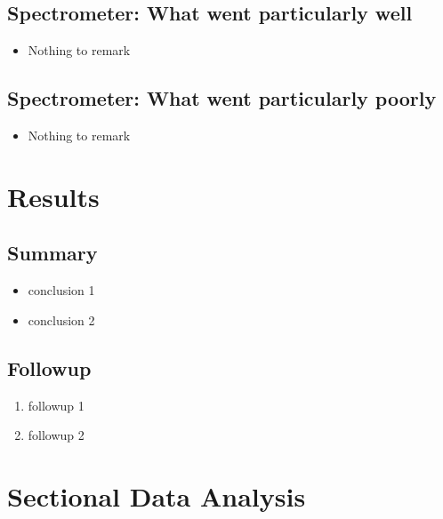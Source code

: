 
\vspace{.3cm}


\subsection{Spectrometer: {\color{blue} What went particularly well}}

\begin{itemize}
\item{Nothing to remark}
\end{itemize}

\subsection{Spectrometer: {\color{red} What went particularly poorly}}

\begin{itemize}
\item{Nothing to remark}
\end{itemize}


\section{Results}


\subsection{Summary}

\begin{itemize}
\item{conclusion 1}
\item{conclusion 2}
\end{itemize}


\subsection{Followup}


\begin{enumerate}
\item{followup 1}
\item{followup 2}
\end{enumerate}

\newpage

\section{Sectional Data Analysis}

